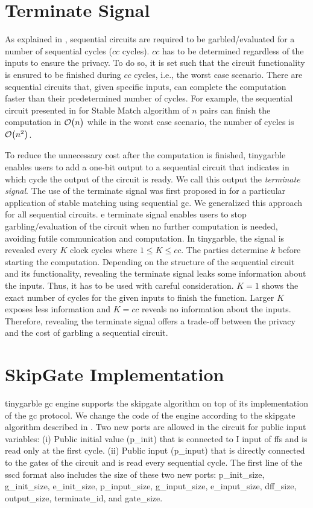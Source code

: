 \section{Terminate Signal}\label{sec:engine-term}
As explained in , sequential circuits are required to be garbled/evaluated for a number of sequential cycles ($cc$ cycles).
$cc$ has to be determined regardless of the inputs to ensure the privacy.
To do so, it is set such that the circuit functionality is ensured to be finished during $cc$ cycles, i.e., the worst case scenario.
There are sequential circuits that, given specific inputs, can complete the computation faster than their predetermined number of cycles.
For example, the sequential circuit presented in \cite{riazi2017toward} for Stable Match algorithm of $n$ pairs can finish the computation in $\mathcal{O}\bigl(n\bigr)$ while in the worst case scenario, the number of cycles is $\mathcal{O}\bigl(n^2\bigr)$.

To reduce the unnecessary cost after the computation is finished, \gls{tinygarble} enables users to add a one-bit output to a sequential circuit that indicates in which cycle the output of the circuit is ready.
We call this output the \textit{terminate signal}.
The use of the terminate signal was first proposed in \cite{riazi2017toward} for a particular application of stable matching using sequential \acrshort{gc}.
We generalized this approach for all sequential circuits.
e terminate signal enables users to stop garbling/evaluation of the circuit when no further computation is needed, avoiding futile communication and computation.
In \gls{tinygarble}, the signal is revealed every $K$ clock cycles where $1 \le K \le cc$.
The parties determine $k$ before starting the computation.
Depending on the structure of the sequential circuit and its functionality, revealing the terminate signal leaks some information about the inputs.
Thus, it has to be used with careful consideration.
$K=1$ shows the exact number of cycles for the given inputs to finish the function.
Larger $K$ exposes less information and $K=cc$ reveals no information about the inputs.
Therefore, revealing the terminate signal offers a trade-off between the privacy and the cost of garbling a sequential circuit.

\section{SkipGate Implementation}\label{sec:engine-skipgate}
\gls{tinygarble} \acrshort{gc} engine supports the \gls{skipgate} algorithm on top of its implementation of the \acrshort{gc} protocol.
We change the code of the engine according to the \gls{skipgate} algorithm described in .
Two new ports are allowed in the circuit for public input variables: (i) Public initial value (p\_init) that is connected to I input of \acrshort{ff}s and is read only at the first cycle. (ii) Public input (p\_input) that is directly connected to the gates of the circuit and is read every sequential cycle.
The first line of the \acrshort{sscd} format also includes the size of these two new ports: p\_init\_size,  g\_init\_size, e\_init\_size, p\_input\_size, g\_input\_size, e\_input\_size, dff\_size, output\_size, terminate\_id, and gate\_size.
